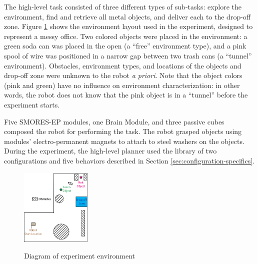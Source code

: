 \documentclass[conference]{IEEEtran}
\begin{document}
The high-level task consisted of three different types of sub-tasks: explore the environment, find and retrieve all metal objects, and deliver each to the drop-off zone. Figure \ref{fig:map} shows the environment layout used in the experiment, designed to represent a messy office. Two colored objects were placed in the environment: a green soda can was placed in the open (a ``free'' environment type), and a pink spool of wire was positioned in a narrow gap between two trash cans (a ``tunnel'' environment). Obstacles, environment types, and locations of the objects and drop-off zone were unknown to the robot \textit{a priori}.  Note that the object colors (pink and green) have no influence on environment characterization: in other words, the robot does not know that the pink object is in a ``tunnel''  before the experiment starts.
 

Five SMORES-EP modules, one Brain Module, and three passive cubes composed the robot for performing the task. The robot grasped objects using modules' electro-permanent magnets to attach to steel washers on the objects.
During the experiment, the high-level planner used the library of two configurations and five behaviors described in Section \ref{sec:configuration-specifics}.

\begin{figure}
\begin{center}
\includegraphics[width=0.3\textwidth]{images/RSSMap.png}
\caption{Diagram of experiment environment}
\vspace{-2em}
\label{fig:map}
\end{center}
\end{figure}
\end{document}
